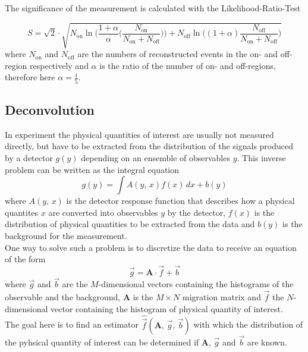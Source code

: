 The significance of the measurement is calculated with the Likelihood-Ratio-Test

\begin{equation}
    S = \sqrt{2} \cdot \sqrt{N_\text{on} \ln \biggl( \frac{1+ \alpha}{\alpha} \biggl( \frac{N_\text{on}}{N_\text{on} + N_\text{off}} \biggr) \biggr)
    + N_\text{off} \ln \biggl( (1+\alpha) \frac{N_\text{off}}{N_\text{on} + N_\text{off} } \biggr) }
\end{equation}
where $N_\text{on}$ and $N_\text{off}$ are the numbers of reconstructed events in the on- and off-region respectively and $\alpha$ is the ratio of the number of
on- and off-regions, therefore here $\alpha = \frac{1}{5}$.


\subsection{Deconvolution}\label{subsec:Decon}

In experiment the physical quantities of interest are usually not measured directly, but have to be extracted from the distribution of the signals
produced by a detector $g(y)$ depending on an ensemble of observables $y$.
This inverse problem can be written as the integral equation
\begin{equation}
    g(y) = \int A(y, \, x) f(x) \, dx + b(y)
\end{equation}
where $A(y, \, x)$ is the detector response function that describes how a physical quantites $x$ are converted into observables $y$ by the detector, $f(x)$
is the distribution of physical quantities to be extracted from the data and $b(y)$ is the background for the measurement. \\
One way to solve such a problem is to discretize the data to receive an equation of the form
\begin{equation}
    \vec{g} = \textbf{A} \cdot \vec {f} + \vec{b}
    \label{eq:disc_inv}
\end{equation}
where $\vec{g}$ and $\vec {b}$ are the $M$-dimensional vectors containing the histograms of the observable and the background, $\textbf{A}$ is the
$M\times N$ migration matrix and $\vec{f}$ the $N$-dimensional vector containing the histogram of physical quantity of interest. \\
The goal here is to find an estimator $\hat{\vec{f}}(\textbf{A}, \, \vec{g}, \, \vec{b})$ with which the distribution of the pyhsical quantity of interest
can be determined if $\textbf{A}$, $\vec{g}$ and $\vec{b}$ are known.

